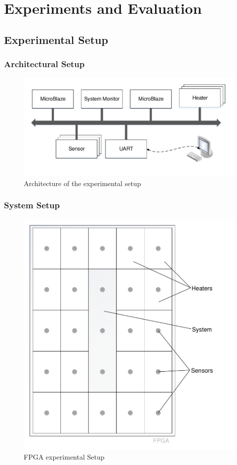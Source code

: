  
\chapter{Experiments and Evaluation}
\label{ch:experiments}

\section{Experimental Setup}
\subsection{Architectural Setup}
\begin{figure}[h]
	\includegraphics[width=\textwidth]{__pics/exsetup.pdf}
	\caption{ Architecture of the experimental setup }
	\label{pic:archsetup}	
\end{figure}

\subsection{System Setup}
\begin{figure}[h]
	\includegraphics[width=\textwidth]{__pics/syssetup.pdf}
	\caption{ \ac{FPGA} experimental Setup}
	\label{pic:syssetup}	
\end{figure}

